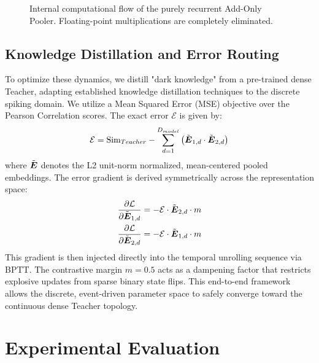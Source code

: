 \documentclass[10pt]{article} %
\begin{document}
\begin{figure}[ht]
{%
}
\caption{Internal computational flow of the purely recurrent Add-Only Pooler. Floating-point multiplications are completely eliminated.}
\label{fig:pooler_mech}
\end{figure}


\subsection{Knowledge Distillation and Error Routing}
To optimize these dynamics, we distill "dark knowledge" from a pre-trained dense Teacher, adapting established knowledge distillation techniques \citep{hinton2015distilling} to the discrete spiking domain. We utilize a Mean Squared Error (MSE) objective over the Pearson Correlation scores. The exact error $\mathcal{E}$ is given by:
\begin{equation}
\mathcal{E} = \text{Sim}_{Teacher} - \sum_{d=1}^{D_{model}} \left(\tilde{\boldsymbol{E}}_{1,d} \cdot \tilde{\boldsymbol{E}}_{2,d}\right)
\end{equation}
where $\tilde{\boldsymbol{E}}$ denotes the L2 unit-norm normalized, mean-centered pooled embeddings. The error gradient is derived symmetrically across the representation space:
\begin{align}
\frac{\partial \mathcal{L}}{\partial \tilde{\boldsymbol{E}}_{1,d}} &= -\mathcal{E} \cdot \tilde{\boldsymbol{E}}_{2,d} \cdot m \\
\frac{\partial \mathcal{L}}{\partial \tilde{\boldsymbol{E}}_{2,d}} &= -\mathcal{E} \cdot \tilde{\boldsymbol{E}}_{1,d} \cdot m
\end{align}
This gradient is then injected directly into the temporal unrolling sequence via BPTT. The contrastive margin $m=0.5$ acts as a dampening factor that restricts explosive updates from sparse binary state flips. This end-to-end framework allows the discrete, event-driven parameter space to safely converge toward the continuous dense Teacher topology.

\section{Experimental Evaluation}
\end{document}
